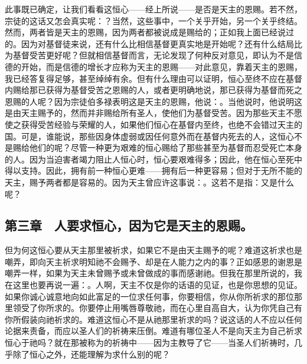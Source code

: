 此事既已确定，让我们看看这恒心——经上所说——是否是天主的恩赐。若不然，宗徒的这话又怎会真实呢：？当然，这些事中，一个关乎开始，另一个关乎终结。然而，两者皆是天主的恩赐，因为两者都被说成是赐给的；正如我上面已经说过的。因为对基督徒来说，还有什么比相信基督更真实地是开始呢？还有什么结局比为基督受苦更好呢？但就相信基督而言，无论发现了何种反对意见，即认为不是信德的开始，而是信德的增长才应称为天主的恩赐——对此意见，靠着天主的恩赐，我已经答复得足够，甚至绰绰有余。但有什么理由可以证明，恒心至终不应在基督内赐给那已获得为基督受苦之恩赐的人，或者更明确地说，那已获得为基督而死之恩赐的人呢？因为宗徒伯多禄表明这是天主的恩赐，他说：。当他说时，他说明这是由天主赐予的，然而并非赐给所有圣人，使他们为基督受苦。因为那些天主不愿使之获得受苦经验与荣耀的人，如果他们恒心在基督内至终，也绝不会错过天主的国。可是，谁能说，那些因身体虚弱或因任何意外而在基督内死去的人，这恒心不是赐给他们的呢？尽管一种更为艰难的恒心赐给了那些甚至为基督而忍受死亡本身的人。因为当迫害者竭力阻止人恒心时，恒心要艰难得多；因此，他在恒心至死中得以支持。因此，拥有前一种恒心更难——拥有后一种更容易；但对于无所不能的天主，赐予两者都是容易的。因为天主曾应许这事说：。这若不是指：又是什么呢？\par


\subsection{第三章　人要求恒心，因为它是天主的恩赐。}

但为何这恒心要从天主那里被祈求，如果它不是由天主赐予的呢？难道这祈求也是嘲弄，即向天主祈求明知祂不会赐予、却是在人能力之内的事？正如感恩的谢恩是嘲弄一样，如果为天主未曾赐予或未曾做成的事而感谢祂。但我在那里所说的，我在这里也要再说一遍：。人啊，天主不仅是你的话语的见证，也是你思想的见证。如果你诚心诚意地向如此富足的一位求任何事，你要相信，你从你所祈求的那位那里领受了你所求的。你要停止用嘴唇尊敬祂，而在心里自高自大，认为你凭自己有你所假装向祂祈求的。难道这恒心不是从祂那里祈求的吗？说这话的人不应以任何论据来责备，而应以圣人们的祈祷来压倒。难道有哪位圣人不是向天主为自己祈求恒心于祂吗？就在那被称为的祈祷中——因为主教导了它——当圣人们祈祷时，几乎除了恒心之外，还能理解为求什么别的呢？\par

